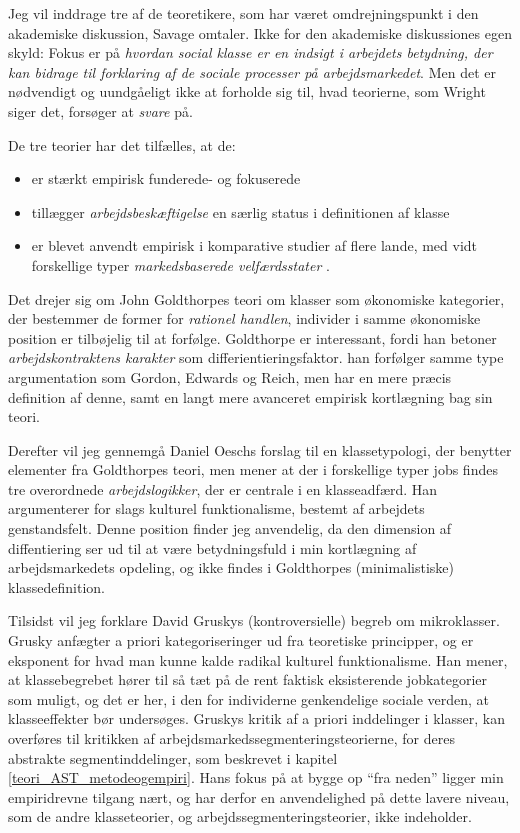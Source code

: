 Jeg vil inddrage tre af de teoretikere, som har været omdrejningspunkt i den akademiske diskussion, Savage omtaler. Ikke for den akademiske diskussiones egen skyld: Fokus er på \emph{hvordan social klasse er en indsigt i arbejdets betydning, der kan bidrage til forklaring af de sociale processer på arbejdsmarkedet}. Men det er nødvendigt og uundgåeligt ikke at forholde sig til, hvad teorierne, som Wright siger det, forsøger at \emph{svare} på. 
 
De tre teorier har det tilfælles, at de:
%
\begin{itemize}
 \itemsep -0.5em
 	\item er stærkt empirisk funderede- og fokuserede
 	\item tillægger \emph{arbejdsbeskæftigelse} en særlig status i definitionen af klasse 
 	\item er blevet anvendt empirisk i komparative studier af flere lande, med vidt forskellige typer \emph{markedsbaserede velfærdsstater} \textcite{Esping-Andersen1990}.
\end{itemize}
%

Det drejer sig om John Goldthorpes teori om klasser som økonomiske kategorier, der bestemmer de former for \emph{rationel handlen}, individer i samme økonomiske position er tilbøjelig til at forfølge. Goldthorpe er interessant, fordi han betoner \emph{arbejdskontraktens karakter} som differientieringsfaktor. han forfølger samme type argumentation som Gordon, Edwards og Reich, men har en mere præcis definition af denne, samt en langt mere avanceret empirisk kortlægning bag sin teori.

Derefter vil jeg gennemgå Daniel Oeschs forslag til en klassetypologi, der benytter elementer fra Goldthorpes teori, men mener at der i forskellige typer jobs findes tre overordnede \emph{arbejdslogikker}, der er centrale i en klasseadfærd. Han argumenterer for slags kulturel funktionalisme, bestemt af arbejdets genstandsfelt. Denne position finder jeg anvendelig, da den dimension af diffentiering ser ud til at være betydningsfuld i min kortlægning af arbejdsmarkedets opdeling, og ikke findes i Goldthorpes (minimalistiske) klassedefinition.

Tilsidst vil jeg forklare David Gruskys (kontroversielle) begreb om mikroklasser. Grusky anfægter a priori kategoriseringer ud fra teoretiske principper, og er eksponent for hvad man kunne kalde radikal kulturel funktionalisme. Han mener, at klassebegrebet hører til så tæt på de rent faktisk eksisterende jobkategorier som muligt, og det er her, i den for individerne genkendelige sociale verden, at klasseeffekter bør undersøges. Gruskys kritik af a priori inddelinger i klasser, kan overføres til kritikken af arbejdsmarkedssegmenteringsteorierne, for deres abstrakte segmentinddelinger, som beskrevet i kapitel \ref{teori_AST_metodeogempiri}. Hans fokus på at bygge op “fra neden” ligger min empiridrevne tilgang nært, og har derfor en anvendelighed på dette lavere niveau, som de andre klasseteorier, og arbejdssegmenteringsteorier, ikke indeholder. 

